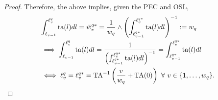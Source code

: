 \documentclass[hidelinks, nonatbib]{elsarticle}
\begin{document}
\begin{lemma}
\begin{proof}
        Therefore, the above implies, given the PEC and OSL,
        \begin{align}
        &
        \int_{\ell_{v-1}}^{\ell_{v}^{q}}{
            \text{ta}(l)
            dl
        }
        =
        \tilde{w}_{v}^{q*} =
        \frac{1}{w_q}
        \land
        \left(
            \int_{
                \ell_{v-1}^{q*}
            }^{
                \ell_{v}^{q*}    
            }{
                \text{ta}(l)
                dl
            }
        \right) ^ {-1}
        :=
        w_q
        \\
        &
        \implies
        \int_{\ell_{v-1}}^{\ell_{v}^{q}}{
            \text{ta}(l)
            dl
        }
        =
        \frac{1}{
            \left(
                \int_{
                    \ell_{v-1}^{q*}
                }^{
                    \ell_{v}^{q*}    
                }{
                    \text{ta}(l)
                    dl
                }
            \right) ^ {-1}
        }
        =
        \int_{
            \ell_{v-1}^{q*}
        }^{
            \ell_{v}^{q*}    
        }{
            \text{ta}(l)
            dl
        }
        \\
        &
        \iff
        \ell_{v}^{q}
        =
        \ell_{v}^{q*}
        =
        \text{TA}^{-1}\left(
            \frac{v}{w_q}
            +
            \text{TA}(0)
        \right)
        \
        \forall
        \
        v \in \{1, \dots, w_q\}
        .
        \end{align}
    \end{proof}
\end{lemma}
\end{document}
